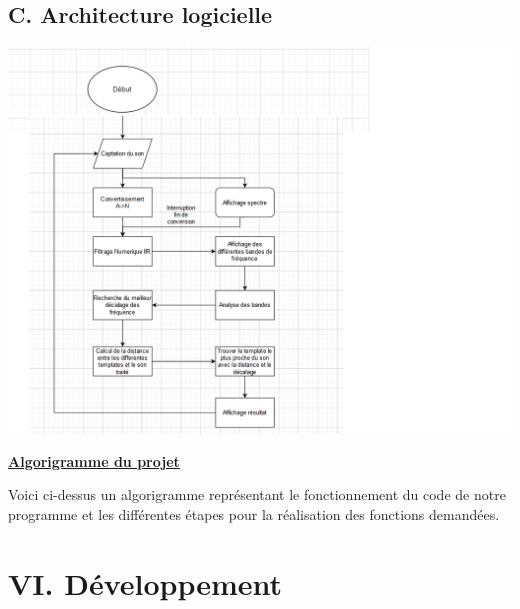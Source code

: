 \documentclass[a4paper,11pt]{book}
\begin{document}
\subsection*{C. Architecture logicielle}
\includegraphics[width=\textwidth]{template_PRJ_TEX_FR/algorigramme.png}
\begin{center} \underline{\textbf{Algorigramme du projet}} 
\end{center}
Voici ci-dessus un algorigramme représentant le fonctionnement du code de notre programme et les différentes étapes pour la réalisation des fonctions demandées.

\newpage
\section*{VI. Développement}
\end{document}
